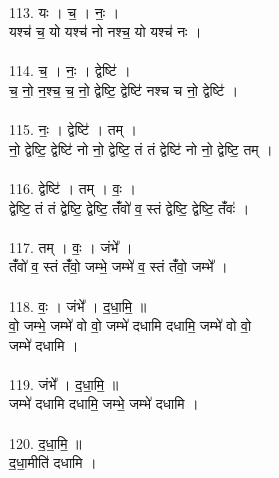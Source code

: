 \\
113. यः । च॒ । नः॒ ।\\
यश्च॑ च॒ यो यश्च॑ नो नश्च॒ यो यश्च॑ नः ।\\
\\
114. च॒ । नः॒ । द्वेष्टि॑ ।\\
च॒ नो॒ न॒श्च॒ च॒ नो॒ द्वेष्टि॒ द्वेष्टि॑ नश्च च नो॒ द्वेष्टि॑ ।\\
\\
115. नः॒ । द्वेष्टि॑ । तम् ।\\
नो॒ द्वेष्टि॒ द्वेष्टि॑ नो नो॒ द्वेष्टि॒ तं तं द्वेष्टि॑ नो नो॒ द्वेष्टि॒ तम् ।\\
\\
116. द्वेष्टि॑ । तम् । वः॒ ।\\
द्वेष्टि॒ तं तं द्वेष्टि॒ द्वेष्टि॒ तंँवो॑ व॒ स्तं द्वेष्टि॒ द्वेष्टि॒ तंँवः॑ ।\\
\\
117. तम् । वः॒ । जंभे᳚ ।\\
तंँवो॑ व॒ स्तं तंँवो॒ जम्भे॒ जम्भे॑ व॒ स्तं तंँवो॒ जम्भे᳚ ।\\
\\
118. वः॒ । जंभे᳚ । द॒धा॒मि॒ ॥\\
वो॒ जम्भे॒ जम्भे॑ वो वो॒ जम्भे॑ दधामि दधामि॒ जम्भे॑ वो वो॒\\
जम्भे॑ दधामि ।\\
\\
119. जंभे᳚ । द॒धा॒मि॒ ॥\\
जम्भे॑ दधामि दधामि॒ जम्भे॒ जम्भे॑ दधामि ।\\
\\
120. द॒धा॒मि॒ ॥\\
द॒धा॒मीति॑ दधामि ।\\
